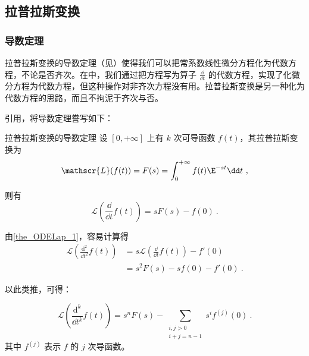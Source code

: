 

\subsection{拉普拉斯变换}

\subsubsection{导数定理}

拉普拉斯变换的导数定理（见）使得我们可以把常系数线性微分方程化为代数方程，不论是否齐次。在中，我们通过把方程写为算子 $\frac{\dd }{\dd t}$ 的代数方程，实现了化微分方程为代数方程，但这种操作对非齐次方程没有用。拉普拉斯变换是另一种化为代数方程的思路，而且不拘泥于齐次与否。

引用，将导数定理誊写如下：
\begin{theorem}{拉普拉斯变换的导数定理}\label{the_ODELap_1}
设 $[0, +\infty]$ 上有 $k$ 次可导函数 $f(t)$，其拉普拉斯变换为
\begin{equation}
\mathscr{L}(f(t))=F(s)=\int^{+\infty}_0f(t)\E^{-st}\dd t~,
\end{equation}

则有
\begin{equation}
\mathscr{L}(\frac{\dd}{\dd t}f(t))=sF(s)-f(0)~.
\end{equation}
\end{theorem}

由\autoref{the_ODELap_1}，容易计算得
\begin{equation}
\begin{aligned}
\mathscr{L}(\frac{\mathrm{d}^2}{\dd t^2}f(t))&=s\mathscr{L}(\frac{\dd}{\dd t}f(t))-f'(0)\\
&=s^2F(s)-sf(0)-f'(0)~.
\end{aligned}
\end{equation}

以此类推，可得：

\begin{corollary}{}\label{cor_ODELap_1}
\begin{equation}
\mathscr{L}(\frac{\mathrm{d}^k}{\dd t^k}f(t))=s^nF(s)-\sum_{\substack{i, j>0\\   i+j=n-1}}s^if^{(j)}(0)~.
\end{equation}
其中 $f^{(j)}$ 表示 $f$ 的 $j$ 次导函数。



\end{corollary}




